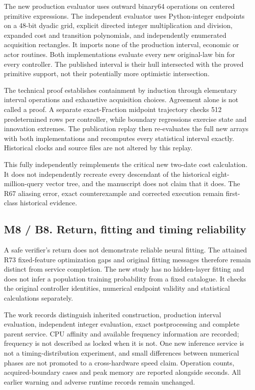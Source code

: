 \documentclass[ecta,nameyear,draft]{econsocart}
\begin{document}
The new production evaluator uses outward binary64 operations on
centered primitive expressions. The independent evaluator uses
Python-integer endpoints on a 48-bit dyadic grid, explicit directed
integer multiplication and division, expanded cost and transition
polynomials, and independently enumerated acquisition rectangles. It
imports none of the production interval, economic or actor routines.
Both implementations evaluate every new original-law bin for every
controller. The published interval is their hull intersected with the
proved primitive support, not their potentially more optimistic
intersection.

The technical proof establishes containment by induction through
elementary interval operations and exhaustive acquisition choices.
Agreement alone is not called a proof. A separate exact-Fraction
midpoint trajectory checks 512 predetermined rows per controller, while
boundary regressions exercise state and innovation extremes. The
publication replay then re-evaluates the full new arrays with both
implementations and recomputes every statistical interval exactly.
Historical clocks and source files are not altered by this replay.

This fully independently reimplements the critical new two-date cost
calculation. It does not independently recreate every descendant of the
historical eight-million-query vector tree, and the manuscript does not
claim that it does. The R67 aliasing error, exact counterexample and
corrected execution remain first-class historical evidence.

\hypertarget{m8-b8.-return-fitting-and-timing-reliability}{%
\subsection{M8 / B8. Return, fitting and timing
reliability}\label{m8-b8.-return-fitting-and-timing-reliability}}

A safe verifier's return does not demonstrate reliable neural fitting.
The attained R73 fixed-feature optimization gaps and original fitting
messages therefore remain distinct from service completion. The new
study has no hidden-layer fitting and does not infer a population
training probability from a fixed catalogue. It checks the original
controller identities, numerical endpoint validity and statistical
calculations separately.

The work records distinguish inherited construction, production interval
evaluation, independent integer evaluation, exact postprocessing and
complete parent service. CPU affinity and available frequency
information are recorded; frequency is not described as locked when it
is not. One new inference service is not a timing-distribution
experiment, and small differences between numerical phases are not
promoted to a cross-hardware speed claim. Operation counts,
acquired-boundary cases and peak memory are reported alongside seconds.
All earlier warning and adverse runtime records remain unchanged.
\end{document}
